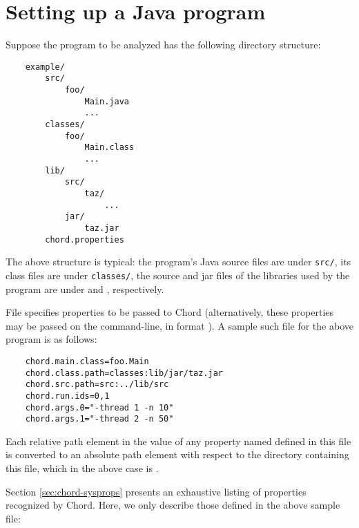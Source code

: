 \section{Setting up a Java program}
\label{sec:program-setup}

Suppose the program to be analyzed has the following directory structure:

\begin{verbatim}
    example/
        src/
            foo/
                Main.java
                ...
        classes/
            foo/
                Main.class
                ...
        lib/
            src/
                taz/
                    ...
            jar/
                taz.jar
        chord.properties
\end{verbatim}

\noindent The above structure is typical: the program's Java source
files are under {\tt src/}, its class files are under {\tt classes/},
the source and jar files of the libraries used by the program are
under  and , respectively.

File  specifies properties to be passed to
Chord (alternatively, these properties may be passed on the
command-line, in format ).  A sample such file
for the above program is as follows:

\begin{verbatim}
    chord.main.class=foo.Main
    chord.class.path=classes:lib/jar/taz.jar
    chord.src.path=src:../lib/src
    chord.run.ids=0,1
    chord.args.0="-thread 1 -n 10"
    chord.args.1="-thread 2 -n 50"
\end{verbatim}

Each relative path element in the value of any property named
 defined in this file is converted to an
absolute path element with respect to the directory containing this
file, which in the above case is .

Section \ref{sec:chord-sysprops} presents an exhaustive listing of
properties recognized by Chord.  Here, we only describe those defined
in the above sample  file:

